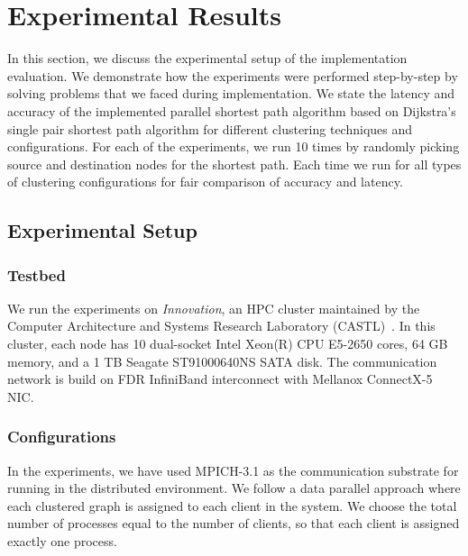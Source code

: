 \section{Experimental Results}
\label{sec:experiment}
In this section, we discuss the experimental setup of the implementation evaluation.
We demonstrate how the experiments were performed step-by-step by solving problems
that we faced during implementation.
We state the latency and accuracy of the implemented parallel shortest path algorithm based on
Dijkstra's single pair shortest path algorithm for different clustering techniques and
configurations. For each of the experiments, we run 10 times by randomly picking source and
destination nodes for the shortest path. Each time we run for all types of clustering configurations
for fair comparison of accuracy and latency.

\subsection{Experimental Setup}
\label{sec:setup}
\subsubsection{Testbed}
We run the experiments on \textit{Innovation}, an HPC cluster maintained by the Computer Architecture
and Systems Research Laboratory (CASTL)~\cite{castl}. In this cluster, each node has 10 dual-socket
Intel Xeon(R) CPU E5-2650 cores, 64 GB memory, and a 1 TB Seagate ST91000640NS SATA disk.
The communication network is build on FDR InfiniBand interconnect with Mellanox ConnectX-5 NIC.
\subsubsection{Configurations}
In the experiments, we have used MPICH-3.1 as the communication substrate for running in the distributed
environment. We follow a data parallel approach where each clustered graph is assigned to each
client in the system. We choose the total number of processes equal to the number of clients, so
that each client is assigned exactly one process.

